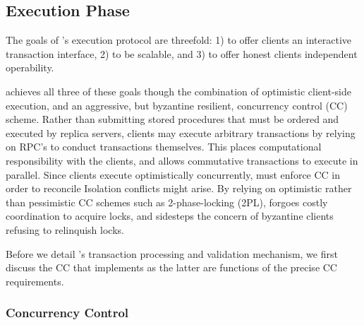 \subsection{Execution Phase}
The goals of \sys{}'s execution protocol are threefold: 1) to offer clients an interactive transaction interface, 2) to be scalable, and 3) to offer honest clients independent operability.

\sys{} achieves all three of these goals though the combination of optimistic client-side execution, and an aggressive, but byzantine resilient, concurrency control (CC) scheme. Rather than submitting stored procedures that must be ordered and executed by replica servers, \sys clients may execute arbitrary transactions by relying on RPC's to conduct transactions themselves. This places computational responsibility with the clients, and allows commutative transactions to execute in parallel. Since \sys clients execute optimistically concurrently, \sys must enforce CC in order to reconcile Isolation conflicts might arise.
By relying on optimistic rather than pessimistic CC schemes such as 2-phase-locking (2PL), \sys{} forgoes costly coordination to acquire locks, and sidesteps the concern of byzantine clients refusing to relinquish locks. 

Before we detail \sys{}'s transaction processing and validation mechanism, we first discuss the CC that \sys implements as the latter are functions of the precise CC requirements. 
 
\subsubsection{Concurrency Control}

